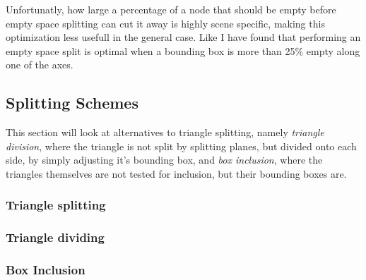 Unfortunatly, how large a percentage of a node that should be empty
before empty space splitting can cut it away is highly scene specific,
making this optimization less usefull in the general case. Like \zhou{}
I have found that performing an empty space split is optimal when a
bounding box is more than 25\% empty along one of the axes.




\subsection{Splitting Schemes}\label{sec:splittingGeom}

This section will look at alternatives to triangle splitting, namely
\textit{triangle division}, where the triangle is not split by
splitting planes, but divided onto each side, by simply adjusting it's
bounding box, and \textit{box inclusion}, where the triangles
themselves are not tested for inclusion, but their bounding boxes are.




\subsubsection{Triangle splitting}


\subsubsection{Triangle dividing}




\subsubsection{Box Inclusion}

